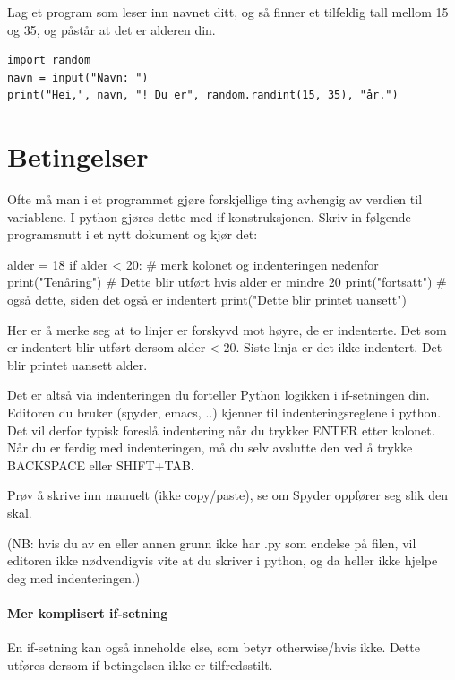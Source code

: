 \begin{exercise}
Lag et program som leser inn navnet ditt, og så finner et tilfeldig tall
mellom 15 og 35, og påstår at det er alderen din.
\end{exercise}
\begin{solution}
\begin{lstlisting}
import random
navn = input("Navn: ")
print("Hei,", navn, "! Du er", random.randint(15, 35), "år.")
\end{lstlisting}
\end{solution}

\section{Betingelser}

Ofte må man i et programmet gjøre forskjellige ting avhengig av verdien til variablene. I python gjøres dette med if-konstruksjonen. Skriv in følgende programsnutt i et nytt dokument og kjør det: 

\begin{usncodebox}
alder = 18
if alder < 20:            # merk kolonet og indenteringen nedenfor
   print("Tenåring")      # Dette blir utført hvis alder er mindre 20
   print("fortsatt")      # også dette, siden det også er indentert
print("Dette blir printet uansett")
\end{usncodebox}

Her er å merke seg at to linjer er forskyvd mot høyre, de er indenterte. Det som er indentert blir utført dersom alder < 20. Siste linja er det ikke indentert. Det blir printet uansett alder.

Det er altså via indenteringen du forteller Python logikken i if-setningen din. Editoren du bruker (spyder, emacs, ..) kjenner til indenteringsreglene i python. Det vil derfor typisk foreslå indentering når du trykker ENTER etter kolonet. Når du er ferdig med indenteringen, må du selv avslutte den ved å trykke BACKSPACE eller SHIFT+TAB. 

Prøv å skrive inn manuelt (ikke copy/paste), se om Spyder oppfører seg slik den skal. 

(NB: hvis du av en eller annen grunn ikke har .py som endelse på filen, vil editoren ikke nødvendigvis vite at du skriver i python, og da heller ikke hjelpe deg med indenteringen.) 

\paragraph{Mer komplisert if-setning}
En if-setning kan også inneholde else, som betyr otherwise/hvis ikke. Dette utføres dersom if-betingelsen ikke er tilfredsstilt. 

